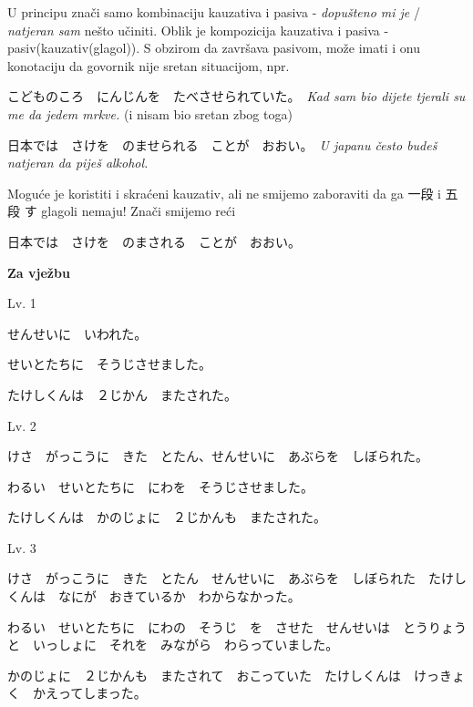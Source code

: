 \documentclass[12pt]{article}
\begin{document}
	U principu znači samo kombinaciju kauzativa i pasiva - \textit{dopušteno mi je} / \textit{natjeran sam} nešto učiniti. Oblik je kompozicija kauzativa i pasiva - pasiv(kauzativ(glagol)). S obzirom da završava pasivom, može imati i onu konotaciju da govornik nije sretan situacijom, npr.
	
	こどものころ　にんじんを　たべさせられていた。　\textit{Kad sam bio dijete tjerali su me da jedem mrkve.} (i nisam bio sretan zbog toga)
	
	日本では　さけを　のませられる　ことが　おおい。　\textit{U japanu često budeš natjeran da piješ alkohol.}
	
	Moguće je koristiti i skraćeni kauzativ, ali ne smijemo zaboraviti da ga 一段 i 五段 す glagoli nemaju! Znači smijemo reći
	
	日本では　さけを　のまされる　ことが　おおい。
	
	\vspace{20pt}
	\normalsize \textbf{Za vježbu}
	\vspace{20pt}
	
	\vspace{5pt}
	\normalsize Lv. 1
	\vspace{5pt}
	
	せんせいに　いわれた。
	
	せいとたちに　そうじさせました。
	
	たけしくんは　２じかん　またされた。
	
	\vspace{5pt}
	\normalsize Lv. 2
	\vspace{5pt}
	
	けさ　がっこうに　きた　とたん、せんせいに　あぶらを　しぼられた。
	
	わるい　せいとたちに　にわを　そうじさせました。
	
	たけしくんは　かのじょに　２じかんも　またされた。
	
	\vspace{5pt}
	\normalsize Lv. 3
	\vspace{5pt}
	
	けさ　がっこうに　きた　とたん　せんせいに　あぶらを　しぼられた　たけしくんは　なにが　おきているか　わからなかった。
	
	わるい　せいとたちに　にわの　そうじ　を　させた　せんせいは　とうりょうと　いっしょに　それを　みながら　わらっていました。
	
	かのじょに　２じかんも　またされて　おこっていた　たけしくんは　けっきょく　かえってしまった。
\end{document}
